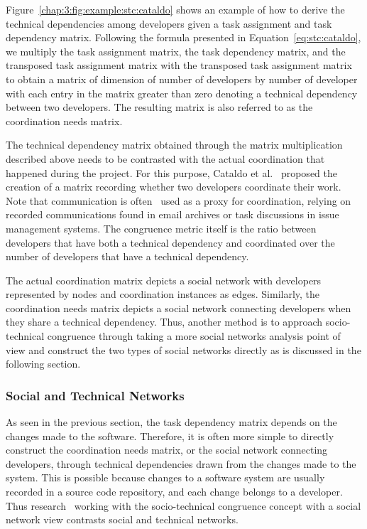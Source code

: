 Figure~\ref{chap:3:fig:example:stc:cataldo} shows an example of how to derive the technical dependencies among developers given a task assignment and task dependency matrix.
Following the formula presented in Equation~\ref{eq:stc:cataldo}, we multiply the task assignment matrix, the task dependency matrix, and the transposed task assignment matrix with the transposed task assignment matrix to obtain a matrix of dimension of number of developers by number of developer with each entry in the matrix greater than zero denoting a technical dependency between two developers.
The resulting matrix is also referred to as the coordination needs matrix.

The technical dependency matrix obtained through the matrix multiplication described above needs to be contrasted with the actual coordination that happened during the project.
For this purpose, Cataldo et al.~\cite{cataldo:cscw:2006} proposed the creation of a matrix recording whether two developers coordinate their work.
Note that communication is often~\cite{cataldo:cscw:2006,kwan:tse:2011,valetto:msr:2007,ducheneaut:cscw:2005,ehrlich:stc:2008,wolf:icse:2009} used as a proxy for coordination,  relying on recorded communications found in email archives or task discussions in issue management systems.
The congruence metric itself is the ratio between developers that have both a technical dependency and coordinated over the number of developers that have a technical dependency.

The actual coordination matrix depicts a social network with developers represented by nodes and coordination instances as edges.
Similarly, the coordination needs matrix depicts a social network connecting developers when they share a technical dependency.
Thus, another method is to approach socio-technical congruence through taking a more social networks analysis point of view and construct the two types of social networks directly as is discussed in the following section.

\subsubsection{Social and Technical Networks}
As seen in the previous section, the task dependency matrix depends on the changes made to the software. 
Therefore, it is often more simple to directly construct the coordination needs matrix, or the social network connecting developers, through technical dependencies drawn from the changes made to the system.
%
This is possible because changes to a software system are usually recorded in a source code repository, and each change belongs to a developer.
Thus research~\cite{cataldo:cscw:2006,kwan:tse:2011,valetto:msr:2007,ducheneaut:cscw:2005,ehrlich:stc:2008} working with the socio-technical congruence concept with a social network view contrasts social and technical networks.

